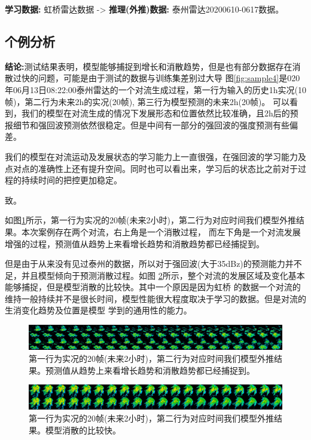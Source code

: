 \documentclass[10pt,english, openany]{book}
\begin{document}
\textbf{学习数据:} 虹桥雷达数据 -> \textbf{推理(外推)数据:} 泰州雷达20200610-0617数据。

\subsection{个例分析}

\textbf{结论:}测试结果表明，模型能够捕捉到增长和消散趋势，但是也有部分数据存在消散过快的问题，可能是由于测试的数据与训练集差别过大导
图\ref{fig:sample4}是020年06月13日08:22:00泰州雷达的一个对流生成过程，第一行为输入的历史1h实况(10帧)，第二行为未来2h的实况(20帧), 第三行为模型预测的未来2h(20帧)。
可以看到，我们的模型在对流生成的情况下发展形态和位置依然比较准确，且2h后的预报细节和强回波预测依然很稳定。但是中间有一部分的强回波的强度预测有些偏差。

我们的模型在对流运动及发展状态的学习能力上一直很强，在强回波的学习能力及点对点的准确性上还有提升空间。同时也可以看出来，学习后的状态比之前对于过程的持续时间的把控更加稳定。

致。

如图\ref{fig:sample1}所示，第一行为实况的20帧(未来2小时)，第二行为对应时间我们模型外推结果。本次案例存在两个对流，右上角是一个消散过程，
而左下角是一个对流发展增强的过程，预测值从趋势上来看增长趋势和消散趋势都已经捕捉到。

但是由于从来没有见过泰州的数据，所以对于强回波(大于35dBz)的预测能力并不足，并且模型倾向于预测消散过程。如图
\ref{fig:sample2}所示，整个对流的发展区域及变化基本能够捕捉，但是模型消散的比较快。其中一个原因是因为虹桥
的数据一个对流的维持一般持续并不是很长时间，模型性能很大程度取决于学习的数据。但是对流的生消变化趋势及位置是模型
学到的通用性的能力。

\begin{figure}
	\centering
	\centering \includegraphics[scale=0.2]{sample1.png}
	\caption{第一行为实况的20帧(未来2小时)，第二行为对应时间我们模型外推结果。预测值从趋势上来看增长趋势和消散趋势都已经捕捉到。}
	\label{fig:sample1}
\end{figure}

\begin{figure}
	\centering
	\centering \includegraphics[scale=0.2]{sample2.png}
	\caption{第一行为实况的20帧(未来2小时)，第二行为对应时间我们模型外推结果。模型消散的比较快。}
	\label{fig:sample2}
\end{figure}
\end{document}
